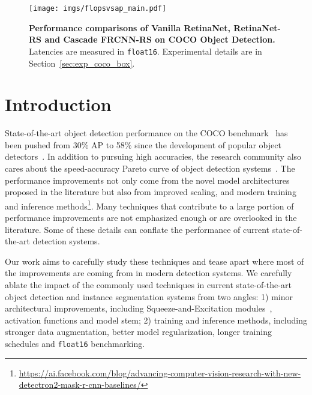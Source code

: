 \documentclass[final]{cvpr}
\begin{document}
\begin{figure}[h]
  \centering
  \texttt{[image: imgs/flopsvsap\_main.pdf]}
\caption{\textbf{Performance comparisons of Vanilla RetinaNet, RetinaNet-RS and Cascade FRCNN-RS on COCO Object Detection.} Latencies are measured in \texttt{float16}. Experimental details are in Section~\ref{sec:exp_coco_box}.}
\label{fig:page1_fig}
\vspace{-0mm}
\end{figure}

\section{Introduction}
State-of-the-art object detection performance on the COCO benchmark~\cite{coco} has been pushed from 30\% AP to 58\% since the development of popular object detectors~\cite{ssd, yolo, yolov3, rcnn, fast_rcnn, fasterrcnn, mrcnn, cai2018cascade, htc, retinanet, centernet, fpn, hrnet, panet, nasfpn, spinenet, Du2020EfficientSB, efficientdet, detr, bochkovskiy2020yolov4, zhang2020resnest, copypaste,wang2021scaledyolov4, liu2021swin}. In addition to pursuing high accuracies, the research community also cares about the speed-accuracy Pareto curve of object detection systems~\cite{huang2017speed}. The performance improvements not only come from the novel model architectures proposed in the literature but also from improved scaling, and modern training and inference methods\footnote{\url{https://ai.facebook.com/blog/advancing-computer-vision-research-with-new-detectron2-mask-r-cnn-baselines/}}.
Many techniques that contribute to a large portion of performance improvements are not emphasized enough or are overlooked in the literature. Some of these details can conflate the performance of current state-of-the-art detection systems.

Our work aims to carefully study these techniques and tease apart where most of the improvements are coming from in modern detection systems. We carefully ablate the impact of the commonly used techniques in current state-of-the-art object detection and instance segmentation systems from two angles: 1) minor architectural improvements, including Squeeze-and-Excitation modules~\cite{senet}, activation functions\cite{silu} and model stem\cite{he2019bag};
2) training and inference methods, including stronger data augmentation, better model regularization\cite{dropconnect}, longer training schedules and \texttt{float16} benchmarking.
\end{document}
